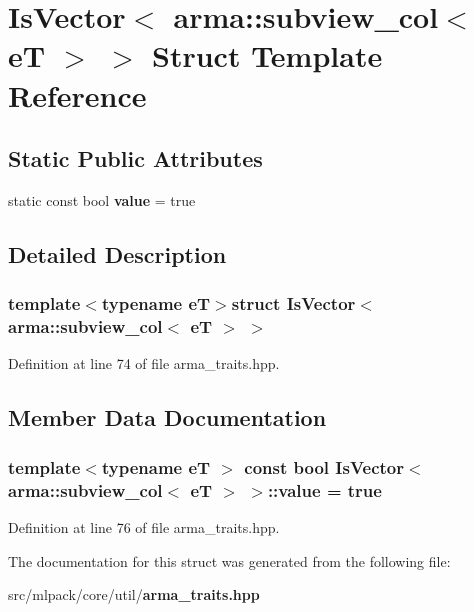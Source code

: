 \section{Is\-Vector$<$ arma\-:\-:subview\-\_\-col$<$ e\-T $>$ $>$ Struct Template Reference}
\label{structIsVector_3_01arma_1_1subview__col_3_01eT_01_4_01_4}
\subsection*{Static Public Attributes}
\begin{DoxyCompactItemize}
\item 
static const bool {\bf value} = true
\end{DoxyCompactItemize}


\subsection{Detailed Description}
\subsubsection*{template$<$typename e\-T$>$struct Is\-Vector$<$ arma\-::subview\-\_\-col$<$ e\-T $>$ $>$}



Definition at line 74 of file arma\-\_\-traits.\-hpp.



\subsection{Member Data Documentation}
\subsubsection[{value}]{\setlength{\rightskip}{0pt plus 5cm}template$<$typename e\-T $>$ const bool {\bf Is\-Vector}$<$ arma\-::subview\-\_\-col$<$ e\-T $>$ $>$\-::value = true\hspace{0.3cm}{\ttfamily [static]}}\label{structIsVector_3_01arma_1_1subview__col_3_01eT_01_4_01_4_ad456570d0b6fd307d1e3f71265ea385f}


Definition at line 76 of file arma\-\_\-traits.\-hpp.



The documentation for this struct was generated from the following file\-:\begin{DoxyCompactItemize}
\item 
src/mlpack/core/util/{\bf arma\-\_\-traits.\-hpp}\end{DoxyCompactItemize}
